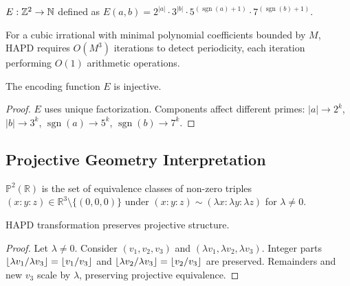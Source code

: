 \begin{definition}\label{def:encoding}
$E : \mathbb{Z}^2 \to \mathbb{N}$ defined as $E(a, b) = 2^{|a|} \cdot 3^{|b|} \cdot 5^{(\operatorname{sgn}(a)+1)} \cdot 7^{(\operatorname{sgn}(b)+1)}$.
\end{definition}

\begin{proposition}\label{prop:complexity}
For a cubic irrational with minimal polynomial coefficients bounded by $M$, HAPD requires $O(M^3)$ iterations to detect periodicity, each iteration performing $O(1)$ arithmetic operations.
\end{proposition}

\begin{lemma}\label{lem:encoding_injective}
The encoding function $E$ is injective.
\end{lemma}

\begin{proof}
$E$ uses unique factorization. Components affect different primes: $|a| \to 2^k$, $|b| \to 3^k$, $\operatorname{sgn}(a) \to 5^k$, $\operatorname{sgn}(b) \to 7^k$.
\end{proof}

\subsection{Projective Geometry Interpretation}

\begin{definition}
$\mathbb{P}^2(\mathbb{R})$ is the set of equivalence classes of non-zero triples $(x : y : z) \in \mathbb{R}^3 \setminus \{(0,0,0)\}$ under $(x : y : z) \sim (\lambda x : \lambda y : \lambda z)$ for $\lambda \neq 0$.
\end{definition}

\begin{proposition}\label{prop:projective_invariance}
HAPD transformation preserves projective structure.
\end{proposition}

\begin{proof}
Let $\lambda \neq 0$. Consider $(v_1, v_2, v_3)$ and $(\lambda v_1, \lambda v_2, \lambda v_3)$. Integer parts $\lfloor \lambda v_1/\lambda v_3 \rfloor = \lfloor v_1/v_3 \rfloor$ and $\lfloor \lambda v_2/\lambda v_3 \rfloor = \lfloor v_2/v_3 \rfloor$ are preserved. Remainders and new $v_3$ scale by $\lambda$, preserving projective equivalence.
\end{proof}

